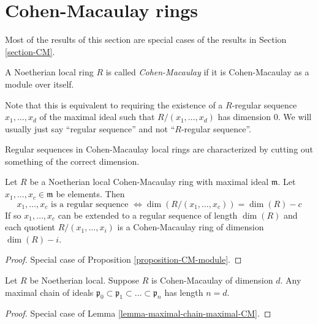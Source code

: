 \section{Cohen-Macaulay rings}
\label{section-CM-ring}

\noindent
Most of the results of this section are special cases of the results
in Section \ref{section-CM}.

\begin{definition}
\label{definition-local-ring-CM}
A Noetherian local ring $R$ is called {\it Cohen-Macaulay}
if it is Cohen-Macaulay as a module over itself.
\end{definition}

\noindent
Note that this is equivalent to requiring the existence
of a $R$-regular sequence $x_1, \ldots, x_d$ of the maximal
ideal such that $R/(x_1, \ldots, x_d)$ has dimension $0$.
We will usually just say ``regular sequence'' and not
``$R$-regular sequence''.

\begin{lemma}
\label{lemma-reformulate-CM}
\begin{slogan}
Regular sequences in Cohen-Macaulay local rings are characterized
by cutting out something of the correct dimension.
\end{slogan}
Let $R$ be a Noetherian local Cohen-Macaulay ring with maximal
ideal $\mathfrak m $. Let $x_1, \ldots, x_c \in \mathfrak m$ be
elements. Then
$$
x_1, \ldots, x_c
\text{ is a regular sequence }
\Leftrightarrow
\dim(R/(x_1, \ldots, x_c)) = \dim(R) - c
$$
If so
$x_1, \ldots, x_c$ can be extended to
a regular sequence of length $\dim(R)$ and each quotient
$R/(x_1, \ldots, x_i)$ is a Cohen-Macaulay ring of dimension
$\dim(R) - i$.
\end{lemma}

\begin{proof}
Special case of Proposition \ref{proposition-CM-module}.
\end{proof}

\begin{lemma}
\label{lemma-maximal-chain-CM}
Let $R$ be Noetherian local.
Suppose $R$ is Cohen-Macaulay of dimension $d$.
Any maximal chain of ideals $\mathfrak p_0 \subset
\mathfrak p_1 \subset \ldots \subset \mathfrak p_n$
has length $n = d$.
\end{lemma}

\begin{proof}
Special case of Lemma \ref{lemma-maximal-chain-maximal-CM}.
\end{proof}

